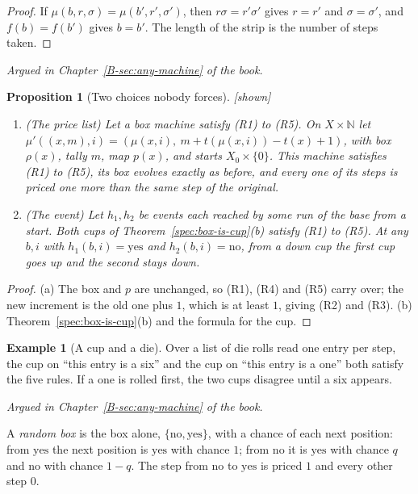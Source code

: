 \documentclass[11pt, a4paper]{article}
\theoremstyle{plain}
\newtheorem{proposition}[theorem]{Proposition}
\theoremstyle{definition}
\newtheorem{example}[theorem]{Example}
\theoremstyle{remark}
\newcommand{\N}{\mathbb{N}}
\newcommand{\argued}[1]{\par\noindent\textit{Argued in Chapter~\ref{B-#1} of the book.}\par}
\newcommand{\kind}[1]{\textup{[#1]}}
\begin{document}
\begin{proof}
If $\mu(b,r,\sigma)=\mu(b',r',\sigma')$, then $r\sigma=r'\sigma'$ gives $r=r'$ and $\sigma=\sigma'$, and
$f(b)=f(b')$ gives $b=b'$. The length of the strip is the number of steps taken.
\end{proof}

\argued{sec:any-machine}

\begin{proposition}[Two choices nobody forces]\label{spec:free-choices} \kind{shown}
\begin{enumerate}[label=(\alph*)]
\item (The price list) Let a box machine satisfy (R1) to (R5). On $X\times\N$ let
$\mu'((x,m),i)=(\mu(x,i),\ m+t(\mu(x,i))-t(x)+1)$, with box $\rho(x)$, tally $m$, map $p(x)$, and starts
$X_0\times\{0\}$. This machine satisfies (R1) to (R5), its box evolves exactly as before, and every one of its
steps is priced one more than the same step of the original.
\item (The event) Let $h_1,h_2$ be events each reached by some run of the base from a start. Both cups of
Theorem~\ref{spec:box-is-cup}(b) satisfy (R1) to (R5). At any $b,i$ with $h_1(b,i)=\mathrm{yes}$ and
$h_2(b,i)=\mathrm{no}$, from a down cup the first cup goes up and the second stays down.
\end{enumerate}
\end{proposition}

\begin{proof}
(a) The box and $p$ are unchanged, so (R1), (R4) and (R5) carry over; the new increment is the old one plus
$1$, which is at least $1$, giving (R2) and (R3). (b) Theorem~\ref{spec:box-is-cup}(b) and the formula for the
cup.
\end{proof}

\begin{example}[A cup and a die]
Over a list of die rolls read one entry per step, the cup on ``this entry is a six'' and the cup on ``this
entry is a one'' both satisfy the five rules. If a one is rolled first, the two cups disagree until a six
appears.
\end{example}

\argued{sec:any-machine}

A \emph{random box} is the box alone, $\{\mathrm{no},\mathrm{yes}\}$, with a chance of each next position:
from $\mathrm{yes}$ the next position is $\mathrm{yes}$ with chance $1$; from $\mathrm{no}$ it is
$\mathrm{yes}$ with chance $q$ and $\mathrm{no}$ with chance $1-q$. The step from $\mathrm{no}$ to
$\mathrm{yes}$ is priced $1$ and every other step $0$.
\end{document}
